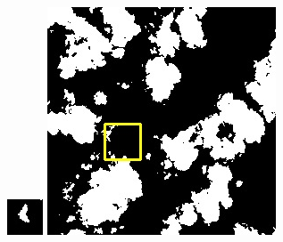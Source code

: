 \documentclass[10pt,UTF8,fntef]{ctexart}
\begin{document}
\begin{multicols}{2}
\begin{figure}[H]
{\begin{minipage}[b]{0.15\linewidth}
            \includegraphics[width=1\linewidth]{../log/spoon4/cut/tmp_cut_LC80460282014171LGN00_12556_my.jpg}\vspace{4pt}
            \includegraphics[width=1\linewidth]{../log/spoon4/cut/LC80980712014024LGN00_15440_my.jpg}\vspace{4pt}

\end{minipage}}
\end{figure}
\end{multicols}
\end{document}
